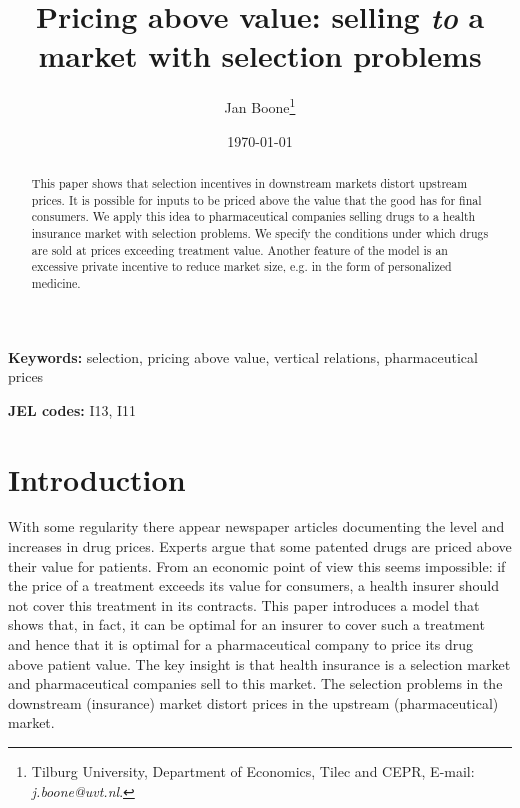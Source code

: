 \documentclass[a4paper,12pt]{article}
\author{Jan Boone\thanks{Tilburg University, Department of Economics, Tilec and CEPR, E-mail: \textit{j.boone@uvt.nl}.}}
\date{\today}
\title{Pricing above value: selling \emph{to} a market with selection problems}
\begin{document}
\maketitle
\maketitle
\begin{abstract}
This paper shows that selection incentives in downstream markets distort upstream prices. It is possible for inputs to be priced above the value that the good has for final consumers. We apply this idea to pharmaceutical companies selling drugs to a health insurance market with selection problems. We specify the conditions under which drugs are sold at prices exceeding treatment value. Another feature of the model is an excessive private incentive to reduce market size, e.g. in the form of personalized medicine.
\end{abstract}

\textbf{Keywords:} selection, pricing above value, vertical relations, pharmaceutical prices

\textbf{JEL codes:} I13, I11


\newpage

\section{Introduction}
\label{sec:orgbf2debf}

With some regularity there appear newspaper articles documenting the level and increases in drug prices. Experts argue that some patented drugs are priced above their value for patients. From an economic point of view this seems impossible: if the price of a treatment exceeds its value for consumers, a health insurer should not cover this treatment in its contracts. This paper introduces a model that shows that, in fact, it can be optimal for an insurer to cover such a treatment and hence that it is optimal for a pharmaceutical company to price its drug above patient value. The key insight is that health insurance is a selection market and pharmaceutical companies sell to this market. The selection problems in the downstream (insurance) market distort prices in the upstream (pharmaceutical) market.
\end{document}
